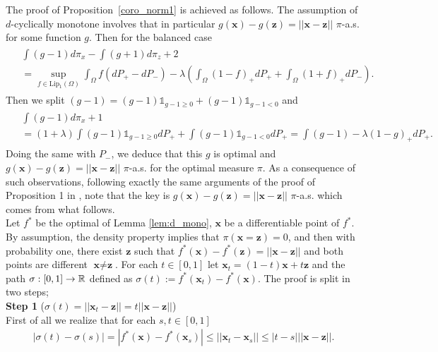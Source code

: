 The proof of Proposition~\ref{coro_norm1} is achieved as follows.
The assumption of $d$-cyclically monotone involves that in particular $g(\textbf{x})-g(\textbf{z})=||\textbf{x}-\textbf{z} ||$ $\pi$-a.s. for some function $g$.  Then for the balanced case
\begin{align*}
\begin{split}
	&\int (g-1)d\pi_x- \int (g+1)d\pi_z+2\\&= \sup_{f\in \text{Lip}_1(\Omega)}\int_{\Omega}f(dP_+-dP_-)-\lambda\left( \int_{\Omega}(1-f)_+dP_+ +\int_{\Omega}(1+f)_+dP_-\right).
	\end{split}
\end{align*}
Then we split $(g-1)=(g-1)\mathds{1}_{g-1\geq 0}+(g-1)\mathds{1}_{g-1< 0}$ and 
\begin{align*}
\begin{split}
	&\int (g-1)d\pi_x+1\\&=(1+\lambda)\int (g-1)\mathds{1}_{g-1\geq 0} dP_++\int (g-1)\mathds{1}_{g-1< 0} dP_+=\int (g-1)- \lambda (1-g)_+ d P_+.
	\end{split}
\end{align*}
Doing the same with $P_-$, we deduce that this $g$ is optimal and  $g(\textbf{x})-g(\textbf{z})=||\textbf{x}-\textbf{z} ||$ $\pi$-a.s. for the optimal measure $\pi$.
As a consequence of such observations, following exactly the same arguments of the proof of Proposition 1 in \cite{gulrajani2017improved}, note that the key is  $g(\textbf{x})-g(\textbf{z})=||\textbf{x}-\textbf{z} ||$ $\pi$-a.s. which comes from what follows. \\
\indent
Let $f^*$ be the optimal of Lemma \ref{lem:d_mono}, $\textbf{x}$ be a differentiable point of $f^*$. By assumption, the density property implies that $\pi(\textbf{x}=\textbf{z})=0$, and then with probability one, there exist $\textbf{z}$ such that $f^*(\textbf{x})-f^*(\textbf{z})=||\textbf{x}-\textbf{z} || $ and both points are different $\textbf{x}\neq \textbf{z}$. For each $t\in[0,1]$ let $\textbf{x}_t=(1-t) \textbf{x}+t\textbf{z}$ and the path $\sigma:[0,1]\rightarrow \mathbb{R}$ defined as $\sigma(t):=f^*(\textbf{x}_t)-f^*(\textbf{x})$. The proof is split in two steps;
\\
\textbf{Step 1} ($\sigma(t)=||\textbf{x}_t-\textbf{z} ||=t|| \textbf{x}-\textbf{z}||$)\\
First of all we realize that for each $s,t\in [0,1]$
\begin{align*}
 |\sigma(t)-\sigma(s)|=| f^*(\textbf{x})-f^*(\textbf{x}_s) |\leq ||\textbf{x}_t-\textbf{x}_s||\leq | t-s|||\textbf{x}-\textbf{z} ||.
\end{align*}
